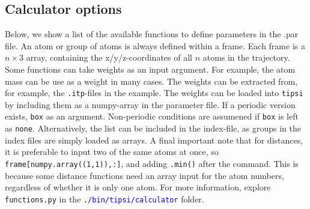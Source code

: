 \documentclass[]{article}
\begin{document}
\subsection*{Calculator options}

Below, we show a list of the available functions to define parameters in the .par file. An atom or group of atoms is always defined within a frame. 
Each frame is a $n \times 3$ array, containing the x/y/z-coordinates of all $n$ atoms in the trajectory. 
Some functions can take weights as an input argument. For example, the atom mass can be use as a weight in many cases.
The weights can be extracted from, for example, the \texttt{.itp}-files in the example.
The weights can be loaded into \texttt{tipsi} by including them as a numpy-array in the parameter file. 
If a periodic version exists, \texttt{box} as an argument. Non-periodic conditions are assumened if \texttt{box} is left as \texttt{none}.
Alternatively, the list can be included in the index-file, as groups in the index files are simply loaded as arrays.
A final important note that for distances, it is preferable to input two of the same atoms at once, so \texttt{frame[numpy.array((1,1)),:]}, and adding \texttt{.min()} after the command.
This is because some distance functions need an array input for the atom numbers, regardless of whether it is only one atom.
For more information, explore \texttt{functions.py} in the \textcolor{blue}{\texttt{./bin/tipsi/calculator}} folder.
\end{document}
